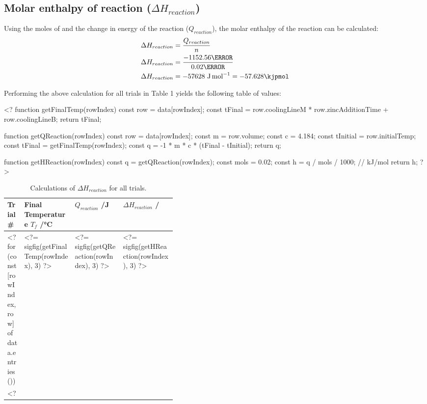 \documentclass[12pt, notitlepage, letterpaper]{report}
\begin{document}
\subsection*{Molar enthalpy of reaction ($\Delta H_{reaction}$)}

Using the moles of  and the change in energy of the reaction ($Q_{reaction}$), the molar enthalpy of the reaction can be calculated:
%
\begin{align*}
	\Delta H_{reaction} & = \frac{Q_{reaction}}{n}                        \\
	\Delta H_{reaction} & = \frac{-1152.56\joule}{0.02\mol}               \\
	\Delta H_{reaction} & = -57628~\unit{\joule\per\mol} = -57.628\kjpmol
\end{align*}

Performing the above calculation for all trials in Table 1 yields the following table of values:

<?
function getFinalTemp(rowIndex) {
	const row = data[rowIndex];
	const tFinal = row.coolingLineM * row.zincAdditionTime + row.coolingLineB;
	return tFinal;
}

function getQReaction(rowIndex) {
	const row = data[rowIndex];
	const m = row.volume;
	const c = 4.184;
	const tInitial = row.initialTemp;
	const tFinal = getFinalTemp(rowIndex);
	const q = -1 * m * c * (tFinal - tInitial);
	return q;
}

function getHReaction(rowIndex) {
	const q = getQReaction(rowIndex);
	const mols = 0.02;
	const h = q / mols / 1000; // kJ/mol
	return h;
}
?>

\begin{table}[H]
	\caption{Calculations of $\Delta H_{reaction}$ for all trials.}
	\def\arraystretch{1.5}
	\begin{tabularx}{\linewidth}{|
			p{0.1\linewidth}|
			p{0.3\linewidth}|
			>{\RaggedRight}X|
			>{\RaggedRight}X|
		}
		\hline
		Trial \#
		 & Final Temperature $T_f$ /\unit{\celsius}
		 & $Q_{reaction}$ /\unit{\joule}
		 & $\Delta H_{reaction}$ /\unit{\kjpmol}
		\\\hline
		<? for (const [rowIndex, row] of data.entries()) { ?>
			<?= rowIndex + 1 ?>
			& <?= sigfig(getFinalTemp(rowIndex), 3) ?>
			& <?= sigfig(getQReaction(rowIndex), 3) ?>
			& <?= sigfig(getHReaction(rowIndex), 3) ?>
			\\\hline
		<? } ?>
\end{tabularx}
\end{table}
\end{document}

